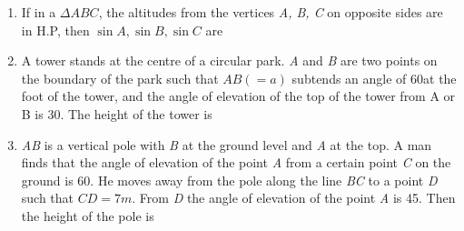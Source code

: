 \documentclass[journal,12pt,twocolumn]{IEEEtran}
\begin{document}
\begin{enumerate}
 \begin{itemize}
 \end{itemize}
 \item If in a $\Delta ABC$, the altitudes from the vertices \textsl{A, B, C} on opposite sides are in H.P, then $\sin A, \sin B, \sin C$ are
 \begin{itemize}
 \end{itemize}
 \item A tower stands at the centre of a circular park. \textsl{A} and \textsl{B} are two points on the boundary of the park such that $AB (=a)$ subtends an angle of 60\degree at the foot of the tower, and the angle of elevation of the top of the tower from A or B is 30\degree. The height of the tower is
 \begin{itemize}
 \end{itemize}
 \item \textsl{AB} is a vertical pole with \textsl{B} at the ground level and \textsl{A} at the top. A man finds that the angle of elevation of the point \textsl{A} from a certain point \textsl{C} on the ground is 60\degree. He  moves away from the pole along the line \textsl{BC} to a point \textsl{D} such that $CD = 7 m$. From \textsl{D} the angle of elevation of the point \textsl{A} is 45\degree. Then the height of the pole is
 \begin{itemize}
\end{itemize}
\end{enumerate}
\end{document}
